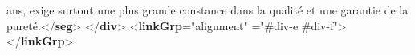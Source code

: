 \begin{shaded}
\hspace*{1em}\hspace*{1em}\hspace*{1em}\hspace*{1em} ans, exige surtout une plus grande constance dans la\mbox{}\newline 
\hspace*{1em}\hspace*{1em}\hspace*{1em}\hspace*{1em} qualité et une garantie de la pureté.{</\textbf{seg}>}\mbox{}\newline 
{}\mbox{}\newline 
{</\textbf{div}>}\mbox{}\newline 
{<\textbf{linkGrp}\hspace*{1em}{type}="{alignment}"\mbox{}\newline 
\hspace*{1em}{domains}="{\#div-e \#div-f}">}\mbox{}\newline 
{}\mbox{}\newline 
{}\mbox{}\newline 
{}\mbox{}\newline 
{}\mbox{}\newline 
{</\textbf{linkGrp}>}\end{shaded}\egroup\par \par
